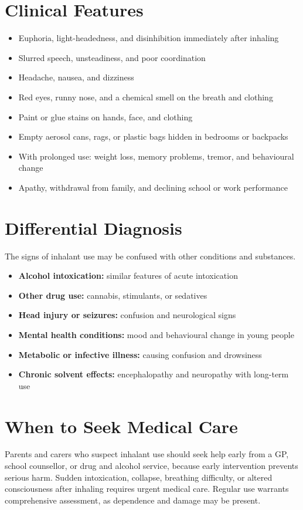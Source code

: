 \section*{Clinical Features}
\begin{itemize}
    \item Euphoria, light-headedness, and disinhibition immediately after inhaling
    \item Slurred speech, unsteadiness, and poor coordination
    \item Headache, nausea, and dizziness
    \item Red eyes, runny nose, and a chemical smell on the breath and clothing
    \item Paint or glue stains on hands, face, and clothing
    \item Empty aerosol cans, rags, or plastic bags hidden in bedrooms or backpacks
    \item With prolonged use: weight loss, memory problems, tremor, and behavioural change
    \item Apathy, withdrawal from family, and declining school or work performance
\end{itemize}

\section*{Differential Diagnosis}
The signs of inhalant use may be confused with other conditions and substances.
\begin{itemize}
    \item \textbf{Alcohol intoxication:} similar features of acute intoxication
    \item \textbf{Other drug use:} cannabis, stimulants, or sedatives
    \item \textbf{Head injury or seizures:} confusion and neurological signs
    \item \textbf{Mental health conditions:} mood and behavioural change in young people
    \item \textbf{Metabolic or infective illness:} causing confusion and drowsiness
    \item \textbf{Chronic solvent effects:} encephalopathy and neuropathy with long-term use
\end{itemize}

\section*{When to Seek Medical Care}
Parents and carers who suspect inhalant use should seek help early from a GP, school counsellor, or drug and alcohol service, because early intervention prevents serious harm. Sudden intoxication, collapse, breathing difficulty, or altered consciousness after inhaling requires urgent medical care. Regular use warrants comprehensive assessment, as dependence and damage may be present.

